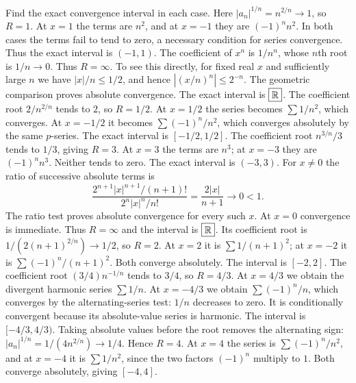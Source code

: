 \goal Find the exact convergence interval in each case.
Here $|a_n|^{1/n}=n^{2/n}\to1$, so $R=1$. At $x=1$ the terms
are $n^2$, and at $x=-1$ they are $(-1)^nn^2$. In both cases the
terms fail to tend to zero, a necessary condition for series convergence.
Thus the exact interval is $\boxed{(-1,1)}$.
The coefficient of $x^n$ is $1/n^n$, whose $n$th root is $1/n\to0$.
Thus $R=\infty$. To see this directly, for fixed real $x$ and sufficiently
large $n$ we have $|x|/n\le1/2$, and hence
$|(x/n)^n|\le2^{-n}$. The geometric comparison proves absolute
convergence. The exact interval is $\boxed{\mathbb{R}}$.
The coefficient root $2/n^{2/n}$ tends to $2$, so $R=1/2$.
At $x=1/2$ the series becomes $\sum1/n^2$, which converges. At
$x=-1/2$ it becomes $\sum(-1)^n/n^2$, which converges absolutely by
the same $p$-series. The exact interval is $\boxed{[-1/2,1/2]}$.
The coefficient root $n^{3/n}/3$ tends to $1/3$, giving $R=3$.
At $x=3$ the terms are $n^3$; at $x=-3$ they are $(-1)^nn^3$.
Neither tends to zero. The exact interval is $\boxed{(-3,3)}$.
For $x\ne0$ the ratio of successive absolute terms is
\[
 \frac{2^{n+1}|x|^{n+1}/(n+1)!}{2^n|x|^n/n!}
 =\frac{2|x|}{n+1}\longrightarrow0<1.
\]
The ratio test proves absolute convergence for every such $x$.
At $x=0$ convergence is immediate. Thus $R=\infty$ and the interval
is $\boxed{\mathbb{R}}$.
Its coefficient root is $1/(2(n+1)^{2/n})\to1/2$, so $R=2$.
At $x=2$ it is $\sum1/(n+1)^2$; at $x=-2$ it is
$\sum(-1)^n/(n+1)^2$. Both converge absolutely. The interval is
$\boxed{[-2,2]}$.
The coefficient root $(3/4)n^{-1/n}$ tends to $3/4$, so $R=4/3$.
At $x=4/3$ we obtain the divergent harmonic series $\sum1/n$.
At $x=-4/3$ we obtain $\sum(-1)^n/n$, which converges by the
alternating-series test: $1/n$ decreases to zero. It is conditionally
convergent because its absolute-value series is harmonic. The interval
is $\boxed{[-4/3,4/3)}$.
Taking absolute values before the root removes the alternating sign:
$|a_n|^{1/n}=1/(4n^{2/n})\to1/4$. Hence $R=4$.
At $x=4$ the series is $\sum(-1)^n/n^2$, and at $x=-4$ it is
$\sum1/n^2$, since the two factors $(-1)^n$ multiply to $1$.
Both converge absolutely, giving $\boxed{[-4,4]}$.

